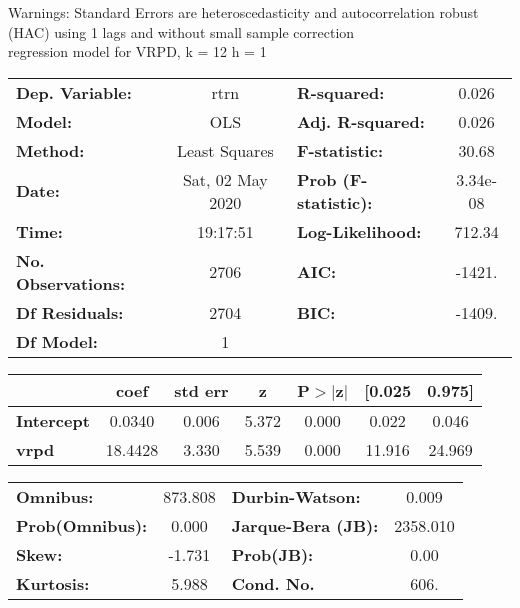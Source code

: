 Warnings: \newline
 [1] Standard Errors are heteroscedasticity and autocorrelation robust (HAC) using 1 lags and without small sample correction\\ 

regression model for VRPD, k = 12 h = 1\begin{center}
\begin{tabular}{lclc}
\toprule
\textbf{Dep. Variable:}    &       rtrn       & \textbf{  R-squared:         } &     0.026   \\
\textbf{Model:}            &       OLS        & \textbf{  Adj. R-squared:    } &     0.026   \\
\textbf{Method:}           &  Least Squares   & \textbf{  F-statistic:       } &     30.68   \\
\textbf{Date:}             & Sat, 02 May 2020 & \textbf{  Prob (F-statistic):} &  3.34e-08   \\
\textbf{Time:}             &     19:17:51     & \textbf{  Log-Likelihood:    } &    712.34   \\
\textbf{No. Observations:} &        2706      & \textbf{  AIC:               } &    -1421.   \\
\textbf{Df Residuals:}     &        2704      & \textbf{  BIC:               } &    -1409.   \\
\textbf{Df Model:}         &           1      & \textbf{                     } &             \\
\bottomrule
\end{tabular}
\begin{tabular}{lcccccc}
                   & \textbf{coef} & \textbf{std err} & \textbf{z} & \textbf{P$> |$z$|$} & \textbf{[0.025} & \textbf{0.975]}  \\
\midrule
\textbf{Intercept} &       0.0340  &        0.006     &     5.372  &         0.000        &        0.022    &        0.046     \\
\textbf{vrpd}      &      18.4428  &        3.330     &     5.539  &         0.000        &       11.916    &       24.969     \\
\bottomrule
\end{tabular}
\begin{tabular}{lclc}
\textbf{Omnibus:}       & 873.808 & \textbf{  Durbin-Watson:     } &    0.009  \\
\textbf{Prob(Omnibus):} &   0.000 & \textbf{  Jarque-Bera (JB):  } & 2358.010  \\
\textbf{Skew:}          &  -1.731 & \textbf{  Prob(JB):          } &     0.00  \\
\textbf{Kurtosis:}      &   5.988 & \textbf{  Cond. No.          } &     606.  \\
\bottomrule
\end{tabular}
\end{center}

